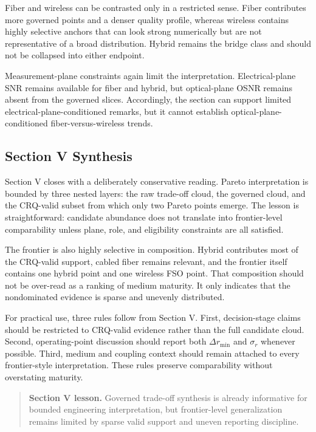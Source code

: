 Fiber and wireless can be contrasted only in a restricted sense. Fiber contributes more governed points and a denser quality profile, whereas wireless contains highly selective anchors that can look strong numerically but are not representative of a broad distribution. Hybrid remains the bridge class and should not be collapsed into either endpoint.

Measurement-plane constraints again limit the interpretation. Electrical-plane SNR remains available for fiber and hybrid, but optical-plane OSNR remains absent from the governed slices. Accordingly, the section can support limited electrical-plane-conditioned remarks, but it cannot establish optical-plane-conditioned fiber-versus-wireless trends.

\subsection{Section V Synthesis}
\label{sec:tradeoff-synthesis}

Section V closes with a deliberately conservative reading. Pareto interpretation is bounded by three nested layers: the raw trade-off cloud, the governed cloud, and the CRQ-valid subset from which only two Pareto points emerge. The lesson is straightforward: candidate abundance does not translate into frontier-level comparability unless plane, role, and eligibility constraints are all satisfied.

The frontier is also highly selective in composition. Hybrid contributes most of the CRQ-valid support, cabled fiber remains relevant, and the frontier itself contains one hybrid point and one wireless FSO point. That composition should not be over-read as a ranking of medium maturity. It only indicates that the nondominated evidence is sparse and unevenly distributed.

For practical use, three rules follow from Section V. First, decision-stage claims should be restricted to CRQ-valid evidence rather than the full candidate cloud. Second, operating-point discussion should report both $\Delta r_{\min}$ and $\sigma_r$ whenever possible. Third, medium and coupling context should remain attached to every frontier-style interpretation. These rules preserve comparability without overstating maturity.

\begin{quote}
\textbf{Section V lesson.} Governed trade-off synthesis is already informative for bounded engineering interpretation, but frontier-level generalization remains limited by sparse valid support and uneven reporting discipline.
\end{quote}
